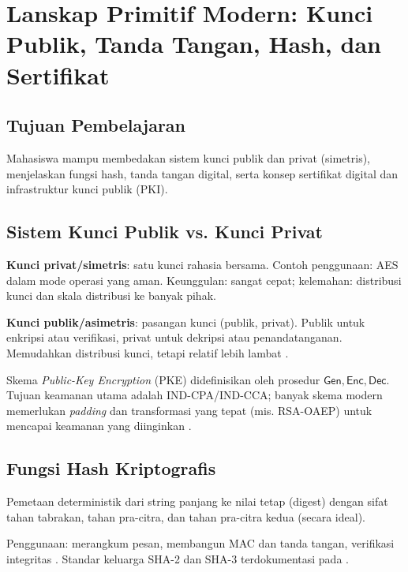 \documentclass[../main.tex]{subfiles}
\begin{document}
\chapter{Lanskap Primitif Modern: Kunci Publik, Tanda Tangan, Hash, dan Sertifikat}

\section{Tujuan Pembelajaran}
Mahasiswa mampu membedakan sistem kunci publik dan privat (simetris), menjelaskan fungsi hash, tanda tangan digital, serta konsep sertifikat digital dan infrastruktur kunci publik (PKI).

\section{Sistem Kunci Publik vs. Kunci Privat}
\textbf{Kunci privat/simetris}: satu kunci rahasia bersama. Contoh penggunaan: AES dalam mode operasi yang aman. Keunggulan: sangat cepat; kelemahan: distribusi kunci dan skala distribusi ke banyak pihak.

\textbf{Kunci publik/asimetris}: pasangan kunci (publik, privat). Publik untuk enkripsi atau verifikasi, privat untuk dekripsi atau penandatanganan. Memudahkan distribusi kunci, tetapi relatif lebih lambat \citep{katzlindell,stallings}.

\begin{definition}
Skema \emph{Public-Key Encryption} (PKE) didefinisikan oleh prosedur \(\mathsf{Gen},\mathsf{Enc},\mathsf{Dec}\). Tujuan keamanan utama adalah IND-CPA/IND-CCA; banyak skema modern memerlukan \emph{padding} dan transformasi yang tepat (mis. RSA-OAEP) untuk mencapai keamanan yang diinginkan \citep{rfc8017,katzlindell}.
\end{definition}

\section{Fungsi Hash Kriptografis}
\begin{definition}
Pemetaan deterministik dari string panjang ke nilai tetap (digest) dengan sifat tahan tabrakan, tahan pra-citra, dan tahan pra-citra kedua (secara ideal).
\end{definition}
Penggunaan: merangkum pesan, membangun MAC dan tanda tangan, verifikasi integritas \citep{menezes}. Standar keluarga SHA-2 dan SHA-3 terdokumentasi pada \citep{fips180-4,fips202}.
\end{document}
